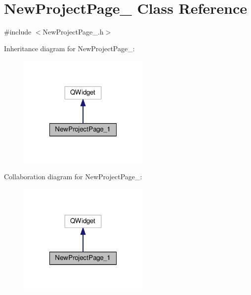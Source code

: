\hypertarget{class_new_project_page__1}{\section{New\-Project\-Page\-\_ Class Reference}
\label{class_new_project_page__1}
}


{\ttfamily \#include $<$New\-Project\-Page\-\_.\-h$>$}



Inheritance diagram for New\-Project\-Page\-\_\-:\nopagebreak
\begin{figure}[H]
\begin{center}
\leavevmode
\includegraphics[width=180pt]{class_new_project_page__1__inherit__graph}
\end{center}
\end{figure}


Collaboration diagram for New\-Project\-Page\-\_\-:\nopagebreak
\begin{figure}[H]
\begin{center}
\leavevmode
\includegraphics[width=180pt]{class_new_project_page__1__coll__graph}
\end{center}
\end{figure}
